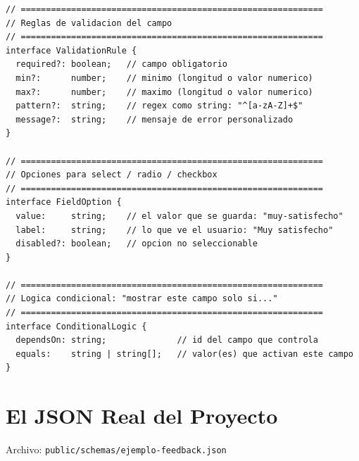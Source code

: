 \documentclass[12pt, a4paper]{article}
\begin{document}
\begin{lstlisting}
// ============================================================
// Reglas de validacion del campo
// ============================================================
interface ValidationRule {
  required?: boolean;   // campo obligatorio
  min?:      number;    // minimo (longitud o valor numerico)
  max?:      number;    // maximo (longitud o valor numerico)
  pattern?:  string;    // regex como string: "^[a-zA-Z]+$"
  message?:  string;    // mensaje de error personalizado
}

// ============================================================
// Opciones para select / radio / checkbox
// ============================================================
interface FieldOption {
  value:     string;    // el valor que se guarda: "muy-satisfecho"
  label:     string;    // lo que ve el usuario: "Muy satisfecho"
  disabled?: boolean;   // opcion no seleccionable
}

// ============================================================
// Logica condicional: "mostrar este campo solo si..."
// ============================================================
interface ConditionalLogic {
  dependsOn: string;              // id del campo que controla
  equals:    string | string[];   // valor(es) que activan este campo
}
\end{lstlisting}

\section{  El JSON Real del Proyecto}

Archivo: \textcolor{morado}{\texttt{public/schemas/ejemplo-feedback.json}}
\end{document}

